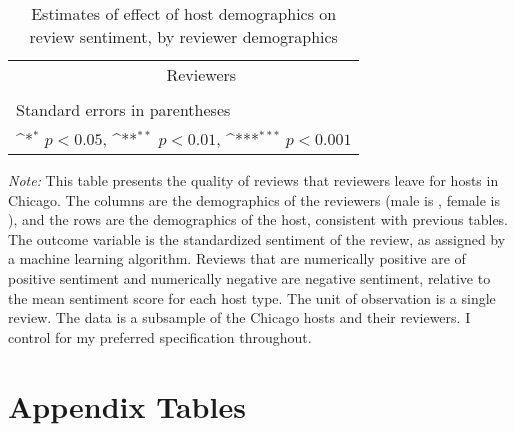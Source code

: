 \begin{landscape}
	\begin{table}[htbp]\centering
		\def\sym#1{\ifmmode^{#1}\else\(^{#1}\)\fi}
		\caption{Estimates of effect of host demographics on review sentiment, by reviewer demographics}
		\begin{tabular}{l *{9}{c}}
			\hline\hline
			&\multicolumn{9}{c}{Reviewers} \\
			\cmidrule(r){3-10}\\
				
			\hline\hline
			\multicolumn{10}{l}{\footnotesize Standard errors in parentheses}\\
			\multicolumn{10}{l}{\footnotesize \sym{*} \(p<0.05\), \sym{**} \(p<0.01\), \sym{***} \(p<0.001\)}\\
		\end{tabular}
	\label{table:sentiment}
	
		\begin{tablenotes}
			
			\item {\it Note:} This table presents the quality of reviews that reviewers leave for hosts in Chicago. The columns are the demographics of the reviewers (male is , female is ), and the rows are the demographics of the host, consistent with previous tables. The outcome variable is the standardized sentiment of the review, as assigned by a machine learning algorithm. Reviews that are numerically positive are of positive sentiment and numerically negative are negative sentiment, relative to the mean sentiment score for each host type. The unit of observation is a single review. The data is a subsample of the Chicago hosts and their reviewers. I control for my preferred specification throughout. 
			
		\end{tablenotes}
		
	\end{table}
\end{landscape}












\newpage

\section*{Appendix Tables}

